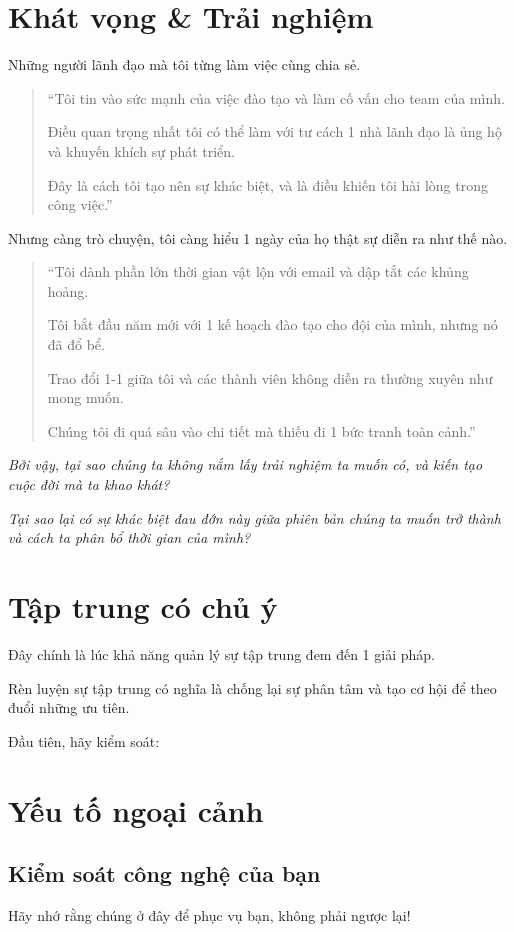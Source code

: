 \documentclass{book}
\numberwithin{equation}{section}
\begin{document}
\section{Khát vọng \& Trải nghiệm}
Những người lãnh đạo mà tôi từng làm việc cùng chia sẻ.
\begin{quotation}
    ``Tôi tin vào sức mạnh của việc đào tạo và làm cố vấn cho team của mình.
    
    Điều quan trọng nhất tôi có thể làm với tư cách 1 nhà lãnh đạo là ủng hộ và khuyến khích sự phát triển.
    
    Đây là cách tôi tạo nên sự khác biệt, và là điều khiến tôi hài lòng trong công việc.''
\end{quotation}
Nhưng càng trò chuyện, tôi càng hiểu 1 ngày của họ thật sự diễn ra như thế nào.
\begin{quotation}
    ``Tôi dành phần lớn thời gian vật lộn với email và dập tắt các khủng hoảng.
    
    Tôi bắt đầu năm mới với 1 kế hoạch đào tạo cho đội của mình, nhưng nó đã đổ bể.
    
    Trao đổi 1-1 giữa tôi và các thành viên không diễn ra thường xuyên như mong muốn.
    
    Chúng tôi đi quá sâu vào chi tiết mà thiếu đi 1 bức tranh toàn cảnh.''
\end{quotation}
\textit{Bởi vậy, tại sao chúng ta không nắm lấy trải nghiệm ta muốn có, và kiến tạo cuộc đời mà ta khao khát?}

\textit{Tại sao lại có sự khác biệt đau đớn này giữa phiên bản chúng ta muốn trở thành và cách ta phân bổ thời gian của mình?}

\section{Tập trung có chủ ý}
Đây chính là lúc khả năng quản lý sự tập trung đem đến 1 giải pháp.

Rèn luyện sự tập trung có nghĩa là chống lại sự phân tâm và tạo cơ hội để theo đuổi những ưu tiên.

Đầu tiên, hãy kiểm soát:

\section{Yếu tố ngoại cảnh}

\subsection{Kiểm soát công nghệ của bạn}
Hãy nhớ rằng chúng ở đây để phục vụ bạn, không phải ngược lại!
\end{document}
